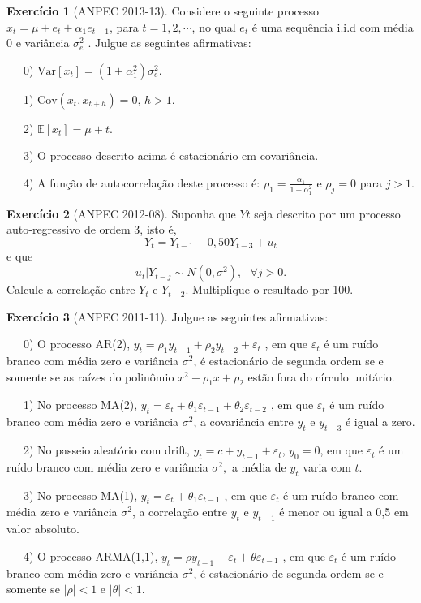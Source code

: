 \documentclass[
]{book}
\theoremstyle{definition}
\theoremstyle{definition}
\theoremstyle{definition}
\newtheorem{exercise}{Exercício}[chapter]
\theoremstyle{remark}
\begin{document}
\begin{exercise}[ANPEC 2013-13]
\protect\hypertarget{exr:a1313}{}{\label{exr:a1313} {} }Considere o seguinte processo \(x_t = \mu + e_t + \alpha_1 e_{t-1}\), para \(t=1,2,\cdots\), no qual \(e_t\) é uma sequência i.i.d com média 0 e variância \(\sigma_e^2\) .
Julgue as seguintes afirmativas:

~~~0) \(\mbox{Var}[ x_t ] = (1 + \alpha_1^2 )\sigma_e^2\).

~~~1) \(\mbox{Cov}( x_t , x_{t +h} ) = 0\), \(h > 1\).

~~~2) \(\mathbb{E}[ x_t ] = \mu + t\).

~~~3) O processo descrito acima é estacionário em covariância.

~~~4) A função de autocorrelação deste processo é: \(\rho_1 =\frac{\alpha_1}{1+\alpha_1^2}\) e \(\rho_j=0\) para \(j>1\).
\end{exercise}

\begin{exercise}[ANPEC 2012-08]
\protect\hypertarget{exr:a128}{}{\label{exr:a128} {} }Suponha que \(Yt\) seja descrito por um processo auto-regressivo de ordem 3, isto é,
\[Y_t = Y_{t-1} - 0,50Y_{t-3} + u_t\]
e que
\[u_t | Y_{t - j}\sim N(0,\sigma^2),\,\,\,\, \forall j > 0.\]
Calcule a correlação entre \(Y_t\) e \(Y_{t-2}\). Multiplique o resultado por 100.
\end{exercise}

\begin{exercise}[ANPEC 2011-11]
\protect\hypertarget{exr:a1111}{}{\label{exr:a1111} {} }Julgue as seguintes afirmativas:

~~~0) O processo AR(2), \(y_t = \rho_1 y_{t-1} + \rho_2 y_{t-2} + \varepsilon_t\) , em que \(\varepsilon_t\) é um ruído branco com média zero e variância \(\sigma^2\), é estacionário de segunda ordem se e somente se as raízes do polinômio \(x^2-\rho_1 x +\rho_2\) estão fora do círculo unitário.

~~~1) No processo MA(2), \(y_t = \varepsilon_t + \theta_1\varepsilon_{t-1} + \theta_2 \varepsilon_{t-2}\) , em que \(\varepsilon_t\) é um ruído branco com média zero e variância \(\sigma^2\), a covariância entre \(y_t\) e \(y_{t-3}\) é igual a zero.

~~~2) No passeio aleatório com drift, \(y_t = c + y_{t-1} + \varepsilon_t\), \(y_0 = 0\), em que \(\varepsilon_t\) é um ruído branco com média zero e variância \(\sigma^2,\) a média de \(y_t\) varia com \(t\).

~~~3) No processo MA(1), \(y_t = \varepsilon_t + \theta_1 \varepsilon_{t-1}\) , em que \(\varepsilon_t\) é um ruído branco com média zero e variância \(\sigma^2\), a correlação entre \(y_t\) e \(y_{t-1}\) é menor ou igual a 0,5 em valor absoluto.

~~~4) O processo ARMA(1,1), \(y_t = \rho y_{t-1} + \varepsilon_t + \theta \varepsilon_{t-1}\) , em que \(\varepsilon_t\) é um ruído branco com média zero e variância \(\sigma^2\), é estacionário de segunda ordem se e somente se \(|\rho| < 1\) e \(|\theta| < 1\).
\end{exercise}
\end{document}
